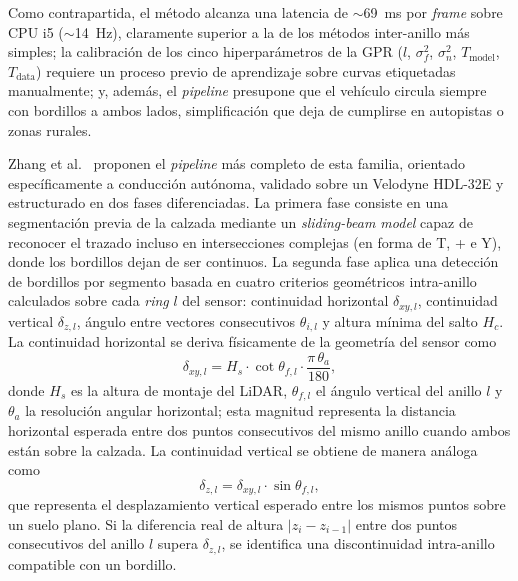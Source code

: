 Como contrapartida, el método alcanza una latencia de
$\sim$69~ms por \textit{frame} sobre CPU i5 ($\sim$14~Hz), claramente
superior a la de los métodos inter-anillo más simples; la calibración
de los cinco hiperparámetros de la GPR ($l$, $\sigma_f^2$,
$\sigma_n^2$, $T_{\text{model}}$, $T_{\text{data}}$) requiere un
proceso previo de aprendizaje sobre curvas etiquetadas manualmente; y,
además, el \textit{pipeline} presupone que el vehículo circula siempre
con bordillos a ambos lados, simplificación que deja de cumplirse en
autopistas o zonas rurales.

Zhang et al.~\cite{yang2013mls} proponen el \textit{pipeline} más
completo de esta familia, orientado específicamente a conducción
autónoma, validado sobre un Velodyne HDL-32E y estructurado en dos
fases diferenciadas. La primera fase consiste en una segmentación
previa de la calzada mediante un \textit{sliding-beam model} capaz de
reconocer el trazado incluso en intersecciones complejas (en forma de
T, + e Y), donde los bordillos dejan de ser continuos. La segunda fase
aplica una detección de bordillos por segmento basada en cuatro
criterios geométricos intra-anillo calculados sobre cada \textit{ring}
$l$ del sensor: continuidad horizontal $\delta_{xy,l}$, continuidad
vertical $\delta_{z,l}$, ángulo entre vectores consecutivos
$\theta_{i,l}$ y altura mínima del salto $H_c$. La continuidad
horizontal se deriva físicamente de la geometría del sensor como
\begin{equation}
    \delta_{xy,l} = H_s \cdot \cot \theta_{f,l} \cdot \frac{\pi \, \theta_a}{180},
\end{equation}
donde $H_s$ es la altura de montaje del LiDAR, $\theta_{f,l}$ el ángulo
vertical del anillo $l$ y $\theta_a$ la resolución angular horizontal;
esta magnitud representa la distancia horizontal esperada entre dos
puntos consecutivos del mismo anillo cuando ambos están sobre la
calzada. La continuidad vertical se obtiene de manera análoga como
\begin{equation}
    \delta_{z,l} = \delta_{xy,l} \cdot \sin \theta_{f,l},
\end{equation}
que representa el desplazamiento vertical esperado entre los mismos
puntos sobre un suelo plano. Si la diferencia real de altura
$\left| z_i - z_{i-1} \right|$ entre dos puntos consecutivos del anillo
$l$ supera $\delta_{z,l}$, se identifica una discontinuidad intra-anillo
compatible con un bordillo.

